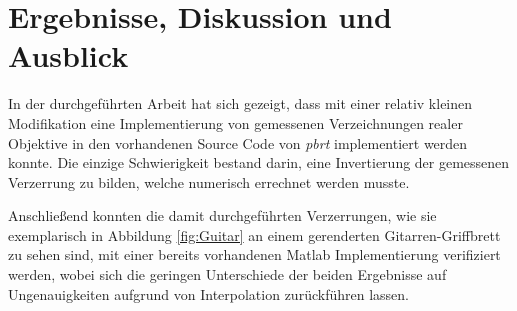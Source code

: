 \newpage
\section{Ergebnisse, Diskussion und Ausblick}

In der durchgeführten Arbeit hat sich gezeigt, dass mit einer relativ kleinen Modifikation eine Implementierung von gemessenen Verzeichnungen realer Objektive in den vorhandenen Source Code von \textit{pbrt} implementiert werden konnte. Die einzige Schwierigkeit bestand darin, eine Invertierung der gemessenen Verzerrung zu bilden, welche numerisch errechnet werden musste. 

Anschließend konnten die damit durchgeführten Verzerrungen, wie sie exemplarisch in Abbildung \ref{fig:Guitar} an einem gerenderten Gitarren-Griffbrett zu sehen sind, mit einer bereits vorhandenen Matlab Implementierung verifiziert werden, wobei sich die geringen Unterschiede der beiden Ergebnisse auf Ungenauigkeiten aufgrund von Interpolation zurückführen lassen.\\


